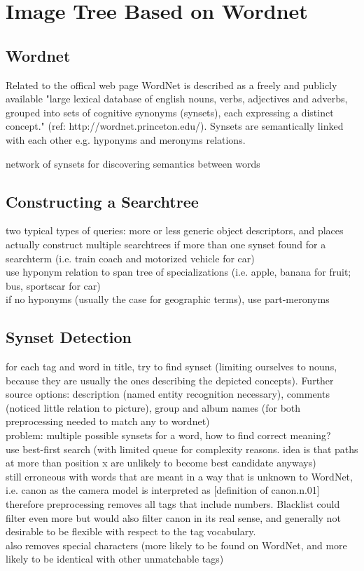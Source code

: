 %
\section{Image Tree Based on Wordnet}
\label{sec_wordnetsearchtree}

\subsection{Wordnet}
Related to the offical web page WordNet is described as a freely and publicly available "large lexical database of english nouns, verbs, adjectives and adverbs, grouped into sets of cognitive synonyms (synsets), each expressing a distinct concept." (ref: http://wordnet.princeton.edu/). Synsets are semantically linked with each other e.g. hyponyms and meronyms relations. 

network of synsets for discovering semantics between words \\
  

\subsection{Constructing a Searchtree}
two typical types of queries: more or less generic object descriptors, and places \\
actually construct multiple searchtrees if more than one synset found for a searchterm (i.e. train coach and motorized vehicle for car)\\
use hyponym relation to span tree of specializations (i.e. apple, banana for fruit; bus, sportscar for car)\\
if no hyponyms (usually the case for geographic terms), use part-meronyms\\

\subsection{Synset Detection}
for each tag and word in title, try to find synset (limiting ourselves to nouns, because they are usually the ones describing the depicted concepts). Further source options: description (named entity recognition necessary), comments (noticed little relation to picture), group and album names (for both preprocessing needed to match any to wordnet)  \\
problem: multiple possible synsets for a word, how to find correct meaning? \\
use best-first search (with limited queue for complexity reasons. idea is that paths at more than position x are unlikely to become best candidate anyways) \\
still erroneous with words that are meant in a way that is unknown to WordNet, i.e. canon as the camera model is interpreted as [definition of canon.n.01]  \\
therefore preprocessing removes all tags that include numbers. Blacklist could filter even more but would also filter canon in its real sense, and generally not desirable to be flexible with respect to the tag vocabulary.  \\
also removes special characters (more likely to be found on WordNet, and more likely to be identical with other unmatchable tags) 

